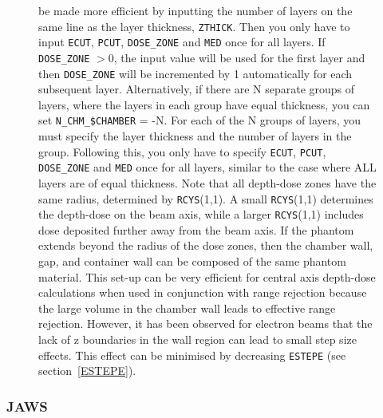 \documentclass[12pt,twoside]{article}
\begin{document}
\begin{figure}[htbp]
{be made more efficient by inputting the number of layers on the same
line as the layer thickness, {\tt ZTHICK}.  Then you only have to
input {\tt ECUT}, {\tt PCUT}, {\tt DOSE\_ZONE} and {\tt MED} once for
all layers.  If {\tt DOSE\_ZONE} $>$0, the input value will be used
for the first layer and then {\tt DOSE\_ZONE} will be incremented by 1
automatically for each subsequent layer.
Alternatively, if there are N separate groups of layers, where the layers
in each group have equal thickness,
you can set {\tt N\_CHM\_\$CHAMBER} = -N.  For each of the N groups of
layers, you must specify the layer thickness and the number
of layers in the group.  Following this, you only have to specify
{\tt ECUT}, {\tt PCUT}, {\tt DOSE\_ZONE} and {\tt MED} once for all layers,
similar to the case where ALL layers are of equal thickness.
Note that all depth-dose zones have the same radius, determined by
{\tt RCYS}(1,1).
A small {\tt RCYS}(1,1) determines the depth-dose on the beam
axis, while a larger {\tt RCYS}(1,1) includes dose deposited further away from
the beam axis.  If the phantom extends beyond the radius of the dose
zones, then the chamber wall, gap, and container wall can be composed of
the same phantom material. This set-up can be very efficient for central
axis depth-dose calculations when used in conjunction with range
rejection because the large volume in the chamber wall leads to
effective range rejection. However, it has been observed for electron
beams that the lack of z boundaries in the wall region can lead to small
step size effects.  This effect can be minimised by decreasing
{\tt ESTEPE} (see section~\ref{ESTEPE}).}
\label{fig_CHAMBERPHANT}
\end{figure}


\clearpage

\begin{small}

\end{small}

\newpage


\subsubsection{JAWS}
\label{jawssect}
\renewcommand{\rightmark}{JAWS CM}
\end{document}

